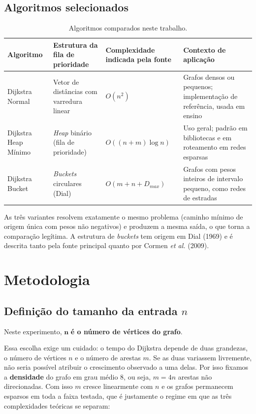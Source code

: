 \documentclass[12pt,a4paper]{article}
\begin{document}
\subsection{Algoritmos selecionados}

\begin{table}[H]
\centering
\caption{Algoritmos comparados neste trabalho.}
\label{tab:algoritmos}
\small
\begin{tabular}{@{}p{2.6cm}p{3.4cm}p{3.2cm}p{4.4cm}@{}}
\toprule
\textbf{Algoritmo} & \textbf{Estrutura da fila de prioridade} &
\textbf{Complexidade indicada pela fonte} & \textbf{Contexto de aplicação} \\
\midrule
Dijkstra Normal & Vetor de distâncias com varredura linear &
$O(n^2)$ &
Grafos densos ou pequenos; implementação de referência, usada em ensino \\
\addlinespace
Dijkstra Heap Mínimo & \emph{Heap} binário (fila de prioridade) &
$O((n+m)\log n)$ &
Uso geral; padrão em bibliotecas e em roteamento em redes esparsas \\
\addlinespace
Dijkstra Bucket & \emph{Buckets} circulares (Dial) &
$O(m+n+D_{max})$ &
Grafos com pesos inteiros de intervalo pequeno, como redes de estradas \\
\bottomrule
\end{tabular}
\end{table}

\noindent
As três variantes resolvem exatamente o mesmo problema (caminho mínimo de
origem única com pesos não negativos) e produzem a mesma saída, o que torna a
comparação legítima. A estrutura de \emph{buckets} tem origem em Dial (1969) e
é descrita tanto pela fonte principal quanto por Cormen \textit{et al.} (2009).

\section{Metodologia}

\subsection{Definição do tamanho da entrada \texorpdfstring{$n$}{n}}

Neste experimento, $\boldsymbol{n}$ \textbf{é o número de vértices do grafo}.

Essa escolha exige um cuidado: o tempo do Dijkstra depende de duas grandezas,
o número de vértices $n$ e o número de arestas $m$. Se as duas variassem
livremente, não seria possível atribuir o crescimento observado a uma delas.
Por isso fixamos a \textbf{densidade} do grafo em grau médio $8$, ou seja,
$m = 4n$ arestas não direcionadas. Com isso $m$ cresce linearmente com $n$ e
os grafos permanecem esparsos em toda a faixa testada, que é justamente o
regime em que as três complexidades teóricas se separam:
\end{document}
